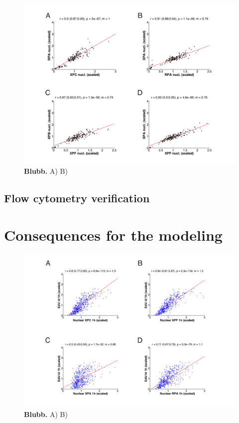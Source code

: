 \begin{figure}[htbp]
	\begin{center}
		\includegraphics[width=1\textwidth]{Abbildungen/figure4_3.pdf}
		\caption{\textbf{Blubb.} A) B) }
		\label{fig:coExpressionData_woDamage}
	\end{center}
\end{figure}

\subsection{Flow cytometry verification}

\section{Consequences for the modeling}

\begin{figure}[htbp]
	\begin{center}
		\includegraphics[width=1\textwidth]{Abbildungen/figure4_6.pdf}
		\caption{\textbf{Blubb.} A) B) }
		\label{fig:coExpressionSim}
	\end{center}
\end{figure}